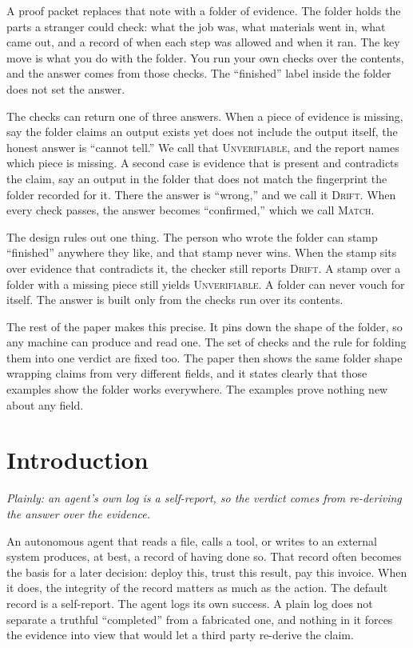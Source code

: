 \documentclass[11pt]{article}
\begin{document}
A proof packet replaces that note with a folder of evidence. The folder holds the parts a stranger could check: what the job was, what materials went in, what came out, and a record of when each step was allowed and when it ran. The key move is what you do with the folder. You run your own checks over the contents, and the answer comes from those checks. The ``finished'' label inside the folder does not set the answer.

The checks can return one of three answers. When a piece of evidence is missing, say the folder claims an output exists yet does not include the output itself, the honest answer is ``cannot tell.'' We call that \textsc{Unverifiable}, and the report names which piece is missing. A second case is evidence that is present and contradicts the claim, say an output in the folder that does not match the fingerprint the folder recorded for it. There the answer is ``wrong,'' and we call it \textsc{Drift}. When every check passes, the answer becomes ``confirmed,'' which we call \textsc{Match}.

The design rules out one thing. The person who wrote the folder can stamp ``finished'' anywhere they like, and that stamp never wins. When the stamp sits over evidence that contradicts it, the checker still reports \textsc{Drift}. A stamp over a folder with a missing piece still yields \textsc{Unverifiable}. A folder can never vouch for itself. The answer is built only from the checks run over its contents.

The rest of the paper makes this precise. It pins down the shape of the folder, so any machine can produce and read one. The set of checks and the rule for folding them into one verdict are fixed too. The paper then shows the same folder shape wrapping claims from very different fields, and it states clearly that those examples show the folder works everywhere. The examples prove nothing new about any field.

\section{Introduction}
\emph{Plainly: an agent's own log is a self-report, so the verdict comes from re-deriving the answer over the evidence.}

An autonomous agent that reads a file, calls a tool, or writes to an external system produces, at best, a record of having done so. That record often becomes the basis for a later decision: deploy this, trust this result, pay this invoice. When it does, the integrity of the record matters as much as the action. The default record is a self-report. The agent logs its own success. A plain log does not separate a truthful ``completed'' from a fabricated one, and nothing in it forces the evidence into view that would let a third party re-derive the claim.
\end{document}
